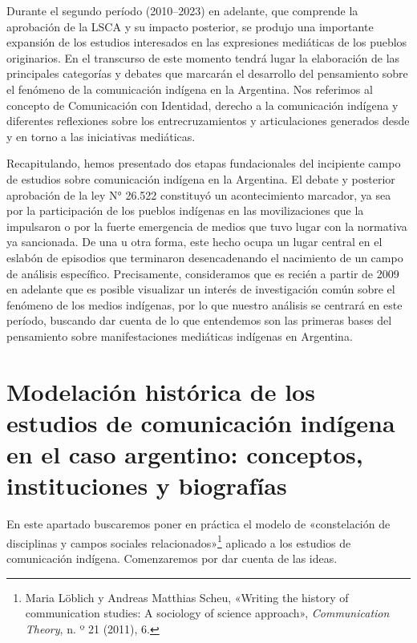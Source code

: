 \documentclass{tufte-handout}
\begin{document}
Durante el segundo período (2010--2023) en adelante, que comprende la
aprobación de la LSCA y su impacto posterior, se produjo una importante
expansión de los estudios interesados en las expresiones mediáticas de
los pueblos originarios. En el transcurso de este momento tendrá lugar
la elaboración de las principales categorías y debates que marcarán el
desarrollo del pensamiento sobre el fenómeno de la comunicación indígena
en la Argentina. Nos referimos al concepto de Comunicación con
Identidad, derecho a la comunicación indígena y diferentes reflexiones
sobre los entrecruzamientos y articulaciones generados desde y en torno
a las iniciativas mediáticas.

Recapitulando, hemos presentado dos etapas fundacionales del incipiente
campo de estudios sobre comunicación indígena en la Argentina. El debate
y posterior aprobación de la ley N° 26.522 constituyó un acontecimiento
marcador, ya sea por la participación de los pueblos indígenas en las
movilizaciones que la impulsaron o por la fuerte emergencia de medios
que tuvo lugar con la normativa ya sancionada. De una u otra forma, este
hecho ocupa un lugar central en el eslabón de episodios que terminaron
desencadenando el nacimiento de un campo de análisis específico.
Precisamente, consideramos que es recién a partir de 2009 en adelante
que es posible visualizar un interés de investigación común sobre el
fenómeno de los medios indígenas, por lo que nuestro análisis se
centrará en este período, buscando dar cuenta de lo que entendemos son
las primeras bases del pensamiento sobre manifestaciones mediáticas
indígenas en Argentina.

\hypertarget{modelacin-histrica-de-los-estudios-de-comunicacin-indgena-en-el-caso-argentino-conceptos-instituciones-y-biografas}{%
\section{Modelación histórica de los estudios de comunicación
indígena\\\noindent en el caso argentino: conceptos, instituciones y
biografías}\label{modelacin-histrica-de-los-estudios-de-comunicacin-indgena-en-el-caso-argentino-conceptos-instituciones-y-biografas}}

En este apartado buscaremos poner en práctica el modelo de «constelación
de disciplinas y campos sociales relacionados»\footnote{Maria Löblich y
  Andreas Matthias Scheu, «Writing the history of communication studies:
  A sociology of science approach», \emph{Communication Theory}, n. º 21
  (2011), 6.} aplicado a los estudios de comunicación indígena.
Comenzaremos por dar cuenta de las ideas.
\end{document}

